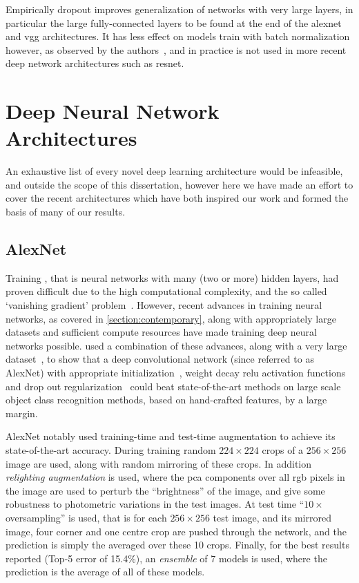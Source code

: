 \documentclass[thesis]{subfiles}
\begin{document}
Empirically dropout improves generalization of networks with very large layers, in particular the large fully-connected layers to be found at the end of the \gls{alexnet} and \gls{vgg} architectures. It has less effect on models train with batch normalization however, as observed by the authors~\citep{Ioffe2015}, and in practice is not used in more recent deep network architectures such as \gls{resnet}.

\section{Deep Neural Network Architectures}
An exhaustive list of every novel deep learning architecture would be infeasible, and outside the scope of this dissertation, however here we have made an effort to cover the recent architectures which have both inspired our work and formed the basis of many of our results.

\subsection{AlexNet}
Training \emph{}, that is neural networks with many (\ie two or more) hidden layers, had proven difficult due to the high computational complexity, and the so called `vanishing gradient' problem~\citep{bengio:ieeenn94}. However, recent advances in training neural networks, as covered in \cref{section:contemporary}, along with appropriately large datasets and sufficient compute resources have made training deep neural networks possible. \citet{Krizhevsky2012} used a combination of these advances, along with a very large dataset~\citep{ILSVRC2015}, to show that a deep convolutional network (since referred to as AlexNet) with appropriate initialization~\citep{Sutskever2013momentum}, weight decay \gls{relu} activation functions~\citep{conf/icml/NairH10} and drop out regularization~\citep{Hinton2012} could beat state-of-the-art methods on large scale object class recognition methods, based on hand-crafted features, by a large margin. 

AlexNet notably used training-time and test-time augmentation to achieve its state-of-the-art accuracy. During training random $224 \times 224$ crops of a $256 \times 256$ image are used, along with random mirroring of these crops. In addition \emph{relighting augmentation} is used, where the \gls{pca} components over all \gls{rgb} pixels in the image are used to perturb the ``brightness'' of the image, and give some robustness to photometric variations in the test images. At test time ``$10\times$ oversampling'' is used, that is for each $256\times 256$ test image, and its mirrored image, four corner and one centre crop are pushed through the network, and the prediction is simply the averaged over these 10 crops. Finally, for the best results reported (Top-5 error of 15.4\%), an \emph{ensemble} of 7 models is used, where the prediction is the average of all of these models. 
\end{document}
